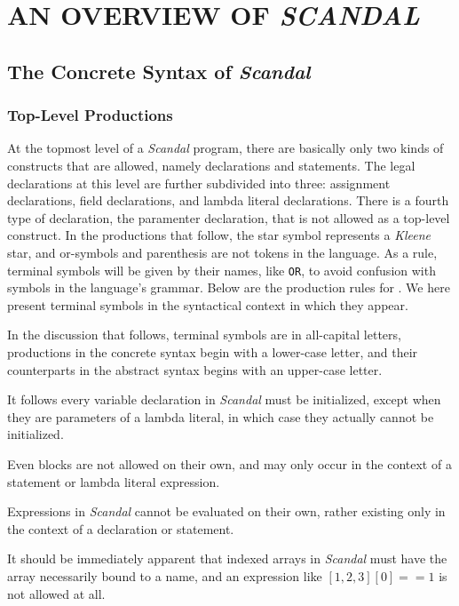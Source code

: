 \chapter{AN OVERVIEW OF \emph{SCANDAL}}

\section{The Concrete Syntax of \emph{Scandal}}

\subsection{Top-Level Productions}

At the topmost level of a \emph{Scandal} program, there are basically only two kinds of constructs that are allowed, namely declarations and statements. The legal declarations at this level are further subdivided into three: assignment declarations, field declarations, and lambda literal declarations. There is a fourth type of declaration, the paramenter declaration, that is not allowed as a top-level construct. In the productions that follow, the star symbol represents a \emph{Kleene} star, and or-symbols and parenthesis are not tokens in the language. As a rule, terminal symbols will be given by their names, like \texttt{OR}, to avoid confusion with symbols in the language's grammar. Below are the production rules for . We here present terminal symbols in the syntactical context in which they appear. %

In the discussion that follows, terminal symbols are in all-capital letters, productions in the concrete syntax begin with a lower-case letter, and their counterparts in the abstract syntax begins with an upper-case letter.

It follows every variable declaration in \emph{Scandal} must be initialized, except when they are parameters of a lambda literal, in which case they actually cannot be initialized.

Even blocks are not allowed on their own, and may only occur in the context of a statement or lambda literal expression.

Expressions in \emph{Scandal} cannot be evaluated on their own, rather existing only in the context of a declaration or statement.

It should be immediately apparent that indexed arrays in \emph{Scandal} must have the array necessarily bound to a name, and an expression like $[1, 2, 3][0] == 1$ is not allowed at all.

